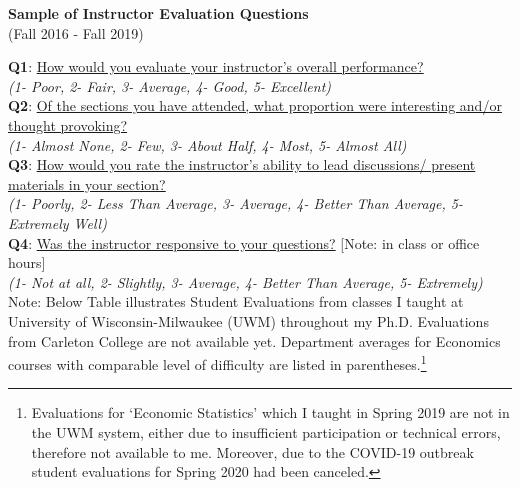 \documentclass[a4paper,11pt]{article}
\begin{document}
\begin{center}
 {\Large \textbf{Sample of Instructor Evaluation Questions}} \\
 (Fall 2016 - Fall 2019) \\
 \end{center}

\textbf{Q1}: \ul{How would you evaluate your instructor's overall performance?} \\
\textit{(1- Poor, 2- Fair, 3- Average, 4- Good, 5- Excellent)} \\
\textbf{Q2}: \ul{Of the sections you have attended, what proportion were interesting and/or thought provoking?} \\
\textit{(1- Almost None, 2- Few, 3- About Half, 4- Most, 5- Almost All)} \\
\textbf{Q3}: \ul{How would you rate the instructor's ability to lead discussions/ present materials in your section?} \\
\textit{(1- Poorly, 2- Less Than Average, 3- Average, 4- Better Than Average, 5- Extremely Well)} \\
\textbf{Q4}: \ul{Was the instructor responsive to your questions?} [Note: in class or office hours] \\
\textit{(1- Not at all, 2- Slightly, 3- Average, 4- Better Than Average, 5- Extremely)} \\



Note: Below Table illustrates Student Evaluations from classes I taught at University of Wisconsin-Milwaukee (UWM) throughout my Ph.D. Evaluations from Carleton College are not available yet. Department averages for Economics courses with comparable level of difficulty are listed in parentheses.\footnote{Evaluations for `Economic Statistics' which I taught in Spring 2019 are not in the UWM system, either due to insufficient participation or technical errors, therefore not available to me. Moreover, due to the COVID-19 outbreak student evaluations for Spring 2020 had been canceled.} 
\end{document}
